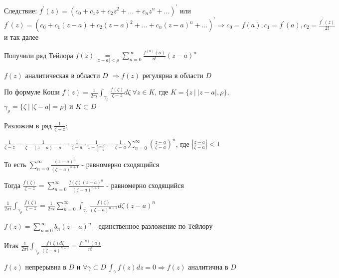\documentclass[12pt]{article}
\begin{document}
Следствие: $f^\prime(z) = (c_0 + c_1 z + c_2 z^2 + \dots + c_n z^n + \dots)^\prime$ или 
$f^\prime(z) = (c_0 + c_1 (z - a) + c_2 (z - a)^2 + \dots + c_n (z - a)^n + \dots)^\prime \Longrightarrow c_0 = f(a), c_1 = f^\prime(a), c_2 = \frac{f^\prime^\prime(z)}{2!}$ и так далее 

Получили ряд Тейлора $f(z) \underset{|z - a| < \rho}{=} \sum_{n = 0}^\infty \frac{f^{(n)} (a)}{n!} (z - a)^n$

\begin{MyTheorem}
    \Ths $f(z)$ аналитическая в области $D$ $\Longrightarrow f(z)$ регулярна в области $D$
\end{MyTheorem}

\begin{MyProof}
    По формуле Коши $f(z) = \frac{1}{2\pi i} \int_{\gamma_\rho} \frac{f(\zeta)}{\zeta - z} d\zeta \ \forall z \in K$, где $K = \{z \ | \ |z - a| , \rho\}$, $\gamma_\rho = \{ \zeta \ | \ |\zeta - a| = \rho\}$ и $K \subset D$

    Разложим в ряд $\frac{1}{\zeta - z}$:

    $\frac{1}{\zeta - z} = \frac{1}{\zeta - (z - a) - a} = \frac{1}{\zeta - a} \cdot \frac{1}{1 - \frac{z - a}{\zeta - a}} = \frac{1}{\zeta - a} \sum_{n = 0}^\infty \left(\frac{z - a}{\zeta - a}\right)^n$, где $\left|\frac{z - a}{\zeta - a}\right| < 1$

    То есть $\sum_{n = 0}^\infty \frac{(z - a)^n}{(\zeta - a)^{n + 1}}$ - равномерно сходящийся

    Тогда $\frac{f(\zeta)}{\zeta - z} = \sum_{n = 0}^\infty \frac{f(\zeta) (z - a)^n}{(\zeta - a)^{n + 1}}$ - равномерно сходящийся 

    $\frac{1}{2\pi i} \int_{\gamma_\rho} \frac{f(\zeta)}{\zeta - z} = \frac{1}{2\pi i} \sum_{n = 0}^\infty \int_{\gamma_\rho} \frac{f(\zeta)}{(\zeta - a)^{n + 1}} d\zeta (z - a)^n$

    $f(z) = \sum_{n = 0}^\infty b_n (z - a)^n$ - единственное разложение по Тейлору

    Итак $\frac{1}{2\pi i} \int_{\gamma_\rho} \frac{f(\zeta) d\zeta}{(\zeta - a)^{n + 1}} = \frac{f^{(n)}(a)}{n!}$
\end{MyProof}







\begin{MyTheorem}
     $f(z)$ непрерывна в $D$ и $\forall \gamma \subset D \ \int_\gamma f(z) dz = 0 \Longrightarrow f(z)$ аналитична в $D$
\end{MyTheorem}
\end{document}
